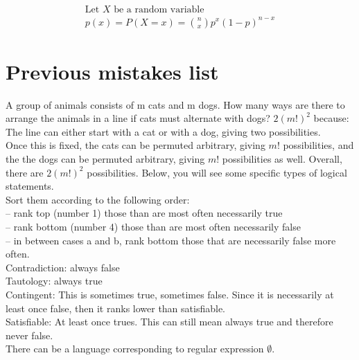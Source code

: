 \documentclass{article}
\begin{document}
\begin{align*}
    \text{Let } X \text{ be a random variable} \\
    p(x) = P(X = x) = \binom{n}{x} p^x (1 - p)^{n - x}
\end{align*}

\section{Previous mistakes list}

\begin{outline}
    \1 A group of animals consists of m cats and m dogs. How many ways are there to arrange the animals in a line if cats must alternate with dogs?
        \2 $2(m!)^2$ because: The line can either start with a cat or with a dog, giving two possibilities. \\
    Once this is fixed, the cats can be permuted arbitrary, giving $ m! $ possibilities, and the the dogs can be permuted arbitrary, giving $ m! $ possibilities as well. Overall, there are $2(m!)^2$ possibilities.
    \1 Below, you will see some specific types of logical statements. \\
    Sort them according to the following order: \\
    -- rank top (number 1) those than are most often necessarily true \\
    -- rank bottom (number 4) those than are most often necessarily false \\
    -- in between cases a and b, rank bottom those that are necessarily false more often.\\
    \2 Contradiction: always false \\
    Tautology: always true \\
    Contingent: This is sometimes true, sometimes false. Since it is necessarily at least once false, then it ranks lower than satisfiable. \\
    Satisfiable: At least once trues. This can still mean always true and therefore never false. \\
    \1 There can be a language corresponding to regular expression $ \emptyset $.
\end{outline}
\end{document}
